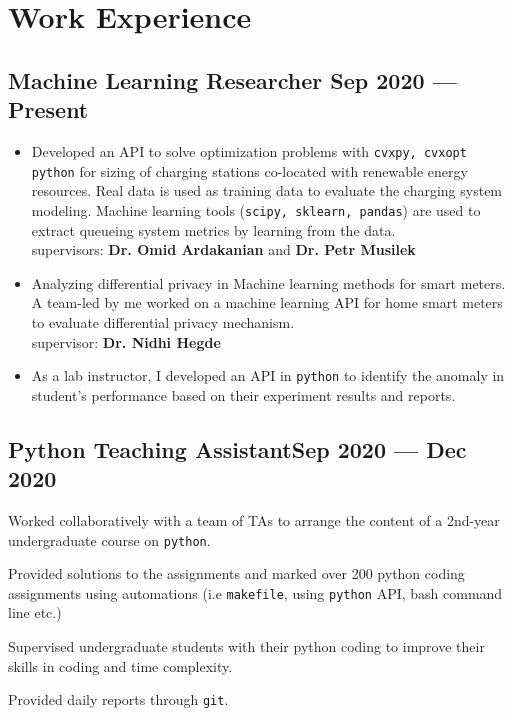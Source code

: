 \documentclass[letter,11pt]{article}
\begin{document}
\section{Work Experience}
\subsection{{Machine Learning Researcher \hfill Sep 2020 --- Present}}
\begin{itemize}
	\item Developed an API to solve optimization problems with \texttt{cvxpy, cvxopt python} for sizing of charging stations co-located with renewable energy resources. Real data is used as training data to evaluate the charging system modeling. Machine learning tools (\texttt{scipy, sklearn, pandas}) are used to extract queueing system metrics by learning from  the data.\\
	supervisors: \textbf{Dr. Omid Ardakanian} and \textbf{Dr. Petr Musilek}
	\item Analyzing differential privacy in Machine learning methods for smart meters. A team-led by me worked on a machine learning API for home smart meters to evaluate differential privacy mechanism.\\
	supervisor: \textbf{Dr. Nidhi Hegde}
	
	
	
	\item As a lab instructor, I developed an API in \texttt{python} to identify the anomaly in student's performance based on their experiment results and reports. 
\end{itemize}

\subsection{{Python Teaching Assistant\hfill Sep 2020 --- Dec 2020}}
\begin{zitemize}
	\item Worked collaboratively with a team of TAs to arrange the content of a 2nd-year undergraduate course on \texttt{python}.
	\item Provided solutions to the assignments and marked over 200 python coding assignments using automations (i.e \texttt{makefile}, using \texttt{python} API, bash command line etc.)
	\item Supervised undergraduate students with their python coding to improve their skills in coding and time complexity.
	\item Provided daily reports through \texttt{git}.
\end{zitemize}
\end{document}
